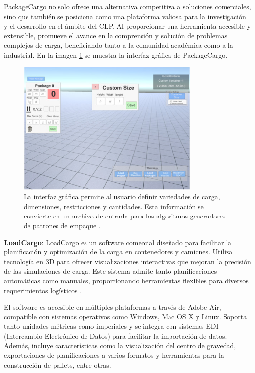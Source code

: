 PackageCargo no solo ofrece una alternativa competitiva a soluciones comerciales, sino que también se posiciona como una plataforma valiosa para la investigación y el desarrollo en el ámbito del CLP. Al proporcionar una herramienta accesible y extensible, promueve el avance en la comprensión y solución de problemas complejos de carga, beneficiando tanto a la comunidad académica como a la industrial. En la imagen \ref{fig:packagecargo} se muestra la interfaz gráfica de PackageCargo.

\begin{figure}[H]
    \centering
    \includegraphics[width=0.8\textwidth]{Figures/packagecargo.jpg}
    \caption{La interfaz gráfica permite al usuario definir variedades de carga, dimensiones, restricciones y cantidades. Esta información se convierte en un archivo de entrada para los algoritmos generadores de patrones de empaque \parencite{MARTINEZFRANCO2020100601}.}
    \label{fig:packagecargo}
\end{figure}


\textbf{LoadCargo}: LoadCargo es un software comercial diseñado para facilitar la planificación y optimización de la carga en contenedores y camiones. Utiliza tecnología en 3D para ofrecer visualizaciones interactivas que mejoran la precisión de las simulaciones de carga. Este sistema admite tanto planificaciones automáticas como manuales, proporcionando herramientas flexibles para diversos requerimientos logísticos \parencite{loadcargo2024}. 

El software es accesible en múltiples plataformas a través de Adobe Air, compatible con sistemas operativos como Windows, Mac OS X y Linux. Soporta tanto unidades métricas como imperiales y se integra con sistemas EDI (Intercambio Electrónico de Datos) para facilitar la importación de datos. Además, incluye características como la visualización del centro de gravedad, exportaciones de planificaciones a varios formatos y herramientas para la construcción de pallets, entre otras. 

